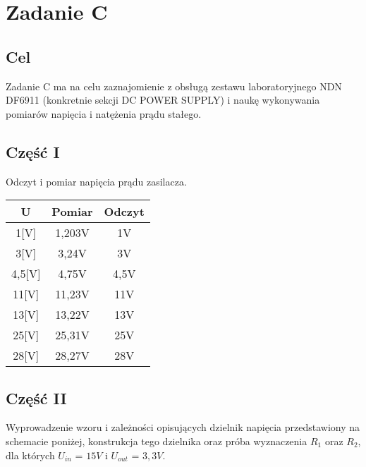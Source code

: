 \documentclass[polish,a4paper]{article}
\begin{document}
\section{Zadanie C}
\subsection*{Cel}
Zadanie C ma na celu zaznajomienie z obsługą zestawu laboratoryjnego NDN DF6911 (konkretnie sekcji DC POWER SUPPLY) i naukę wykonywania pomiarów napięcia i natężenia prądu stałego.


\subsection{Część I}
Odczyt i pomiar napięcia prądu zasilacza.

\begin{center}
\begin{tabular}{|c|c|c|}
\hline
\textbf{U} & \textbf{Pomiar} & \textbf{Odczyt}\\
\hline
1[V] & 1,203V & 1V\\
\hline
3[V] & 3,24V & 3V\\
\hline
4,5[V] & 4,75V & 4,5V\\
\hline
11[V] & 11,23V & 11V\\
\hline
13[V] & 13,22V & 13V\\
\hline
25[V] & 25,31V & 25V\\
\hline
28[V] & 28,27V & 28V\\
\hline
\end{tabular}
\end{center}

\subsection{Część II}
Wyprowadzenie wzoru i zależności opisujących dzielnik napięcia przedstawiony na schemacie poniżej, konstrukcja tego dzielnika oraz próba wyznaczenia $R_{1}$ oraz $R_{2}$, dla których $U_{in}$ = $15V$ i $U_{out}$ = $3,3V$.\\

\begin{figure}[!h]
\centering
{}
\end{figure}
\newpage
\end{document}
